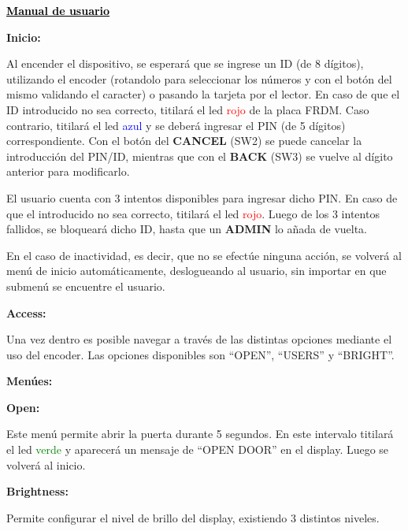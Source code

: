 \begin{center}
\textcolor{black}{\huge{\textbf{\underline{Manual de usuario}}}}
\end{center}

\begin{center}
\textbf{\LARGE{Inicio:}}
\end{center}

Al encender el dispositivo, se esperará que se ingrese un ID (de 8 dígitos), utilizando el encoder (rotandolo para seleccionar los números y con el botón del mismo validando el caracter) o pasando la tarjeta por el lector. En caso de que el ID introducido no sea correcto, titilará el led \textcolor{red}{rojo} de la placa FRDM. Caso contrario, titilará el led \textcolor{blue}{azul} y se deberá ingresar el PIN (de 5 dígitos) correspondiente. Con el botón del \textbf{CANCEL} (SW2) se puede cancelar la introducción del PIN/ID, mientras que con el \textbf{BACK} (SW3) se vuelve al dígito anterior para modificarlo.

El usuario cuenta con 3 intentos disponibles para ingresar dicho PIN. En caso de que el introducido no sea correcto, titilará el led \textcolor{red}{rojo}. Luego de los 3 intentos fallidos, se bloqueará dicho ID, hasta que un \textbf{ADMIN} lo añada de vuelta.

En el caso de inactividad, es decir, que no se efectúe ninguna acción, se volverá al menú de inicio automáticamente, deslogueando al usuario, sin importar en que submenú se encuentre el usuario.

\begin{center}
\textbf{\LARGE{Access:}}
\end{center}

Una vez dentro es posible navegar a través de las distintas opciones mediante el uso del encoder. Las opciones disponibles son ``OPEN'', ``USERS'' y ``BRIGHT''. 

\begin{center}
\textbf{\LARGE{Menúes:}}
\end{center}


\textbf{\Large{Open:}} 

Este menú permite abrir la puerta durante 5 segundos. En este intervalo titilará el led \textcolor{green}{verde} y aparecerá un mensaje de ``OPEN DOOR'' en el display. Luego se volverá al inicio.

\vspace*{0.5cm}
\textbf{\Large{Brightness:}}

Permite configurar el nivel de brillo del display, existiendo 3 distintos niveles.

